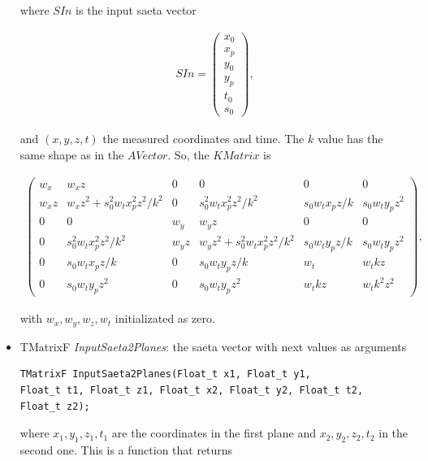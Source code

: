 \documentclass[a4paper]{book}
\begin{document}
\begin{itemize}
	where $SIn$ is the input saeta vector

	\begin{align*}
	SIn = \left(
	\begin{array}{c}
	x_0\\
	x_p\\
	y_0\\
	y_p\\
	t_0\\
	s_0
	\end{array} \right),
	\end{align*}
	
	and $(x, y, z, t)$ the measured coordinates and time. The $k$ value has the same shape as in the $AVector$. So, the $KMatrix$ is
	
	\begin{align*}
	\left(
	\begin{array}{cccccc}
	w_x   & w_x z                             & 0     & 0                        & 0               & 0\\
	w_x z & w_x z^2 + s_0^2 w_t x_p^2 z^2/k^2 & 0     & s_0^2 w_t x_p^2 z^2 /k^2 & s_0 w_t x_p z/k & s_0 w_t y_p z^2 \\
	0     & 0                                 & w_y   & w_y z                    & 0               & 0\\
	0     & s_0^2 w_t x_p^2 z^2 /k^2          & w_y z & w_y z^2 + s_0^2 w_t x_p^2 z^2/k^2 & s_0 w_t y_p z/k & s_0 w_t y_p z^2\\
	0     & s_0 w_t x_p z/k                   & 0     & s_0 w_t y_p z/k          & w_t             & w_t k z\\
	0     & s_0 w_t y_p z^2                   & 0     & s_0 w_t y_p z^2          & w_t k z         & w_t k^2 z^2
	\end{array} \right),
	\end{align*}
	
	with $w_x, w_y, w_z, w_t$ initializated as zero.
	
	\item TMatrixF \textit{InputSaeta2Planes}:  the saeta vector with next values as arguments
	
	\begin{lstlisting}
TMatrixF InputSaeta2Planes(Float_t x1, Float_t y1, 
Float_t t1, Float_t z1, Float_t x2, Float_t y2, Float_t t2, 
Float_t z2);
	\end{lstlisting}
	
	where $x_1, y_1, z_1, t_1$ are the coordinates in the first plane and $x_2, y_2, z_2, t_2$ in the second one. This is a function that returns
	

\end{itemize}
\end{document}
